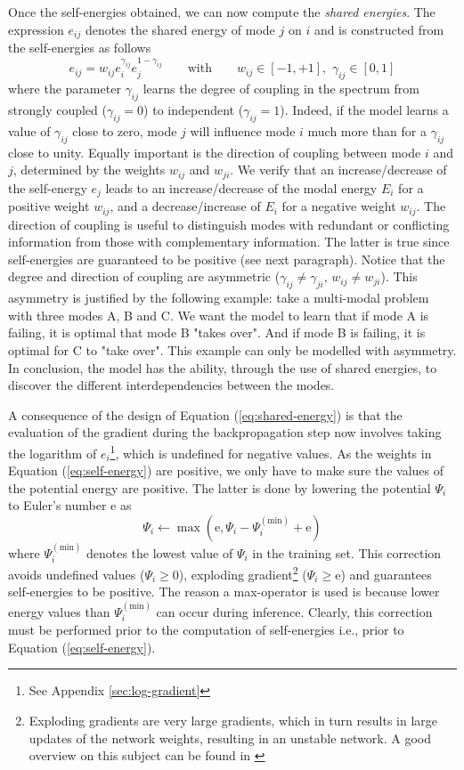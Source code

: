 Once the self-energies obtained, we can now compute the \textit{shared energies}. The expression $e_{ij}$ denotes the shared energy of mode $j$ on $i$ and is constructed from the self-energies as follows
\begin{equation}
e_{ij} = w_{ij}e_i^{\gamma_{ij}}e_j^{1-\gamma_{ij}} \qquad \text{with} \qquad w_{ij} \in [-1,+1],\,\, \gamma_{ij} \in [0,1]
\label{eq:shared-energy}
\end{equation}
where the parameter $\gamma_{ij}$ learns the degree of coupling in the spectrum from strongly coupled ($\gamma_{ij}=0$) to independent ($\gamma_{ij} = 1$). Indeed, if the model learns a value of $\gamma_{ij}$ close to zero, mode $j$ will influence mode $i$ much more than for a $\gamma_{ij}$ close to unity. Equally important is the direction of coupling between mode $i$ and $j$, determined by the weights $w_{ij}$ and $w_{ji}$. We verify that an increase/decrease of the self-energy $e_j$ leads to an increase/decrease of the modal energy $E_i$ for a positive weight $w_{ij}$, and a decrease/increase of $E_i$ for a negative weight $w_{ij}$. The direction of coupling is useful to distinguish modes with redundant or conflicting information from those with complementary information. The latter is true since self-energies are guaranteed to be positive (see next paragraph). Notice that the degree and direction of coupling are asymmetric ($\gamma_{ij} \neq \gamma_{ji},\, w_{ij} \neq w_{ji}$). This asymmetry is justified by the following example: take a multi-modal problem with three modes A, B and C. We want the model to learn that if mode A is failing, it is optimal that mode B "takes over". And if mode B is failing, it is optimal for C to "take over". This example can only be modelled with asymmetry. In conclusion, the model has the ability, through the use of shared energies, to discover the different interdependencies between the modes.

A consequence of the design of Equation (\ref{eq:shared-energy}) is that the evaluation of the gradient during the backpropagation step now involves taking the logarithm of $e_i$\footnote{See Appendix \ref{sec:log-gradient}}, which is undefined for negative values. As the weights in Equation (\ref{eq:self-energy}) are positive, we only have to make sure the values of the potential energy are positive. The latter is done by lowering the potential $\Psi_i$ to Euler's number $\mathrm{e}$ as
\begin{equation}
\Psi_i \leftarrow \max(\mathrm{e}, \Psi_i - \Psi_i^{(\text{min})} + \mathrm{e})
\end{equation}
where $\Psi_i^{(\text{min})}$ denotes the lowest value of $\Psi_i$ in the training set. This correction avoids undefined values ($\Psi_i \geq 0$), exploding gradient\footnote{Exploding gradients are very large gradients, which in turn results in large updates of the network weights, resulting in an unstable network. A good overview on this subject can be found in \citep{exploding}} ($\Psi_i \geq \mathrm{e}$) and guarantees self-energies to be positive. The reason a max-operator is used is because lower energy values than $\Psi_i^{(\text{min})}$  can occur during inference. Clearly, this correction must be performed prior to the computation of self-energies i.e., prior to Equation (\ref{eq:self-energy}).

